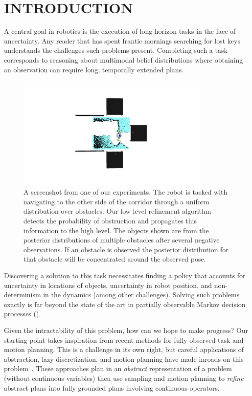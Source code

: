 \section{INTRODUCTION}
A central goal in robotics is the execution of long-horizon tasks in
the face of uncertainty. Any reader that has spent frantic mornings
searching for lost keys understands the challenges such problems
present. Completing such a task corresponds to reasoning about
multimodal belief distributions where obtaining an observation
can require long, temporally extended plans. 
\begin{figure}[h]
  \centering
    \noindent
    \includegraphics[trim = 160mm 90mm 0mm 90mm, clip, width=0.85\textwidth]{corridor_images/corridor_path_2.png}
  \caption{A screenshot from one of our experiments. The robot is
    tasked with navigating to the other side of the corridor through a uniform distribution over obstacles. Our low
    level refinement algorithm detects the probability of obstruction and
    propagates this information to the high level. The objects shown are
    from the posterior distributions of multiple obstacles after several negative
    observations. If an obstacle is observed the posterior distribution for that obstacle will be concentrated around the observed pose.}
  \label{fig:knot_steps}
\end{figure}


Discovering a solution to this task necessitates finding a policy that
accounts for uncertainty in locations of objects, uncertainty in robot position,
and non-determinism in the dynamics (among other
challenges). Solving such problems exactly is far beyond the state of
the art in partially observable Markov decision processes (\pomdp).

Given the intractability of this problem, how can we hope to make
progress? Our starting point takes inspiration from recent methods for
fully observed task and motion planning.  This is a challenge in its
own right, but careful applications of abstraction, lazy
discretization, and motion planning have made inroads on this
problem~\cite{srivastava2014combined, lozano2014constraint}. These
approaches plan in an \emph{abstract} representation of a problem
(without continuous variables) then use sampling and motion planning to
\emph{refine} abstract plans into fully grounded plans involving continuous
operators.

